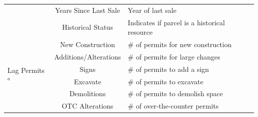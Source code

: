 \documentclass[a4paper,12pt]{article}
\begin{document}
\begin{longtable}{|p{1.6cm}|c|p{7cm}|}
& Years Since Last Sale & Year of last sale \\ 
& Historical Status & Indicates if parcel is a historical resource\\
\hline
\multirow{7}{2cm}{Lag Permits$^a$} & New Construction & \# of permits for new construction \\
& Additions/Alterations & \# of permits for large changes\\
& Signs & \# of permits to add a sign \\
& Excavate & \# of permits to excavate \\
& Demolitions & \# of permits to demolish space \\
& OTC Alterations & \# of over-the-counter permits
\label{tab:data.sources}
\end{longtable}
\end{document}
